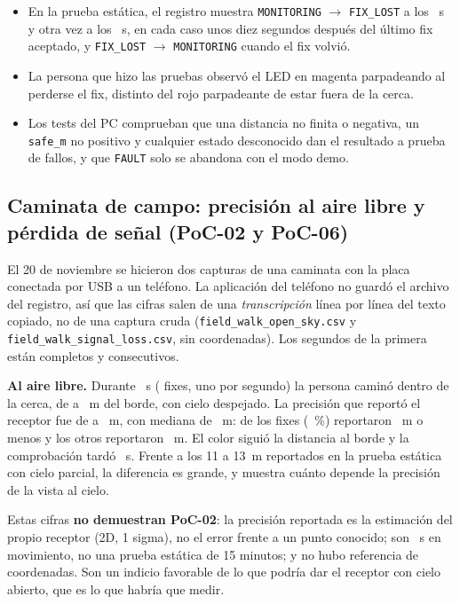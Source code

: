 \begin{itemize}
  \item En la prueba estática, el registro muestra \texttt{MONITORING} $\to$ \texttt{FIX\_LOST} a los
        \dStaticLostFirstS~s y otra vez a los \dStaticLostSecondS~s, en cada caso unos diez segundos después del
        último fix aceptado, y \texttt{FIX\_LOST} $\to$ \texttt{MONITORING} cuando el fix volvió.
  \item La persona que hizo las pruebas observó el LED en magenta parpadeando al perderse el fix, distinto del
        rojo parpadeante de estar fuera de la cerca.
  \item Los tests del PC comprueban que una distancia no finita o negativa, un \texttt{safe\_m} no positivo y
        cualquier estado desconocido dan el resultado a prueba de fallos, y que \texttt{FAULT} solo se
        abandona con el modo demo.
\end{itemize}

\subsection{Caminata de campo: precisión al aire libre y pérdida de señal (PoC-02 y PoC-06)}

El 20 de noviembre se hicieron dos capturas de una caminata con la placa conectada por USB a un teléfono. La
aplicación del teléfono no guardó el archivo del registro, así que las cifras salen de una \emph{transcripción}
línea por línea del texto copiado, no de una captura cruda (\texttt{field\_\allowbreak walk\_\allowbreak open\_\allowbreak sky.csv} y
\texttt{field\_\allowbreak walk\_\allowbreak signal\_\allowbreak loss.csv}, sin coordenadas). Los segundos de la primera están completos y
consecutivos.

\textbf{Al aire libre.} Durante \dWalkSeconds~s (\dWalkFixes{} fixes, uno por segundo) la persona caminó dentro de la
cerca, de \dWalkDistMin{} a \dWalkDistMax~m del borde, con cielo despejado. La precisión que reportó el receptor
fue de \dWalkAccMin{} a \dWalkAccMax~m, con mediana de \dWalkAccMedian~m: \dWalkWithin{} de los \dWalkFixes{} fixes
(\dWalkWithinPct~\%) reportaron \dReqCep~m o menos y los otros \dWalkAbove{} reportaron \dWalkAccMax~m. El color
siguió la distancia al borde y la comprobación tardó \dCrossCheckInUs~\textmu s. Frente a los 11 a 13~m
reportados en la prueba estática con cielo parcial, la diferencia es grande, y muestra cuánto depende la
precisión de la vista al cielo.

Estas cifras \textbf{no demuestran PoC-02}: la precisión reportada es la estimación del propio receptor (2D, 1
sigma), no el error frente a un punto conocido; son \dWalkSeconds~s en movimiento, no una prueba estática de
15 minutos; y no hubo referencia de coordenadas. Son un indicio favorable de lo que podría dar el receptor con
cielo abierto, que es lo que habría que medir.

